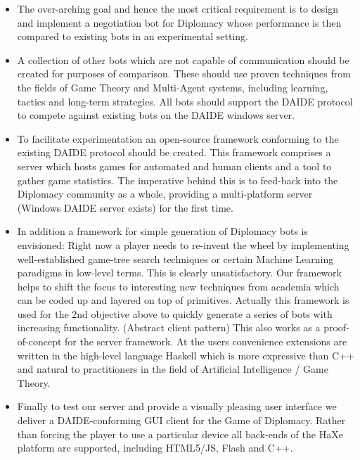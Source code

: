 \documentclass[pdftex,12pt,a4paper]{report}
\begin{document}
\begin{itemize}

\item The over-arching goal and hence the most critical requirement is
  to design and implement a negotiation bot for Diplomacy whose
  performance is then compared to existing bots in an experimental
  setting. 

\item A collection of other bots which are not capable of communication
  should be created for purposes of comparison. These should use
  proven techniques from the fields of Game Theory and Multi-Agent
  systems, including learning, tactics and long-term strategies. All
  bots should support the DAIDE protocol to compete against existing
  bots on the DAIDE windows server.

\item To facilitate experimentation an open-source framework
  conforming to the existing DAIDE protocol should be created. This
  framework comprises a server which hosts games for automated and
  human clients and a tool to gather game statistics. The imperative
  behind this is to feed-back into the Diplomacy community as a whole,
  providing a multi-platform server (Windows DAIDE server exists) for
  the first time.

\item In addition a framework for simple generation of Diplomacy bots
  is envisioned: Right now a player needs to re-invent the wheel by
  implementing well-established game-tree search techniques or certain
  Machine Learning paradigms in low-level terms. This is clearly
  unsatisfactory. Our framework helps to shift the focus to
  interesting new techniques from academia which can be coded up and
  layered on top of primitives. Actually this framework is used for
  the 2nd objective above to quickly generate a series of bots with
  increasing functionality.  (Abstract client pattern) This also works
  as a proof-of-concept for the server framework. At the users
  convenience extensions are written in the high-level language
  Haskell which is more expressive than C++ and natural to
  practitioners in the field of Artificial Intelligence / Game Theory.

\item Finally to test our server and provide a visually pleasing user
  interface we deliver a DAIDE-conforming GUI client for the Game
  of Diplomacy.  Rather than forcing the player to use a particular
  device all back-ends of the HaXe platform are supported, including
  HTML5/JS, Flash and C++.

\end{itemize}
\end{document}
